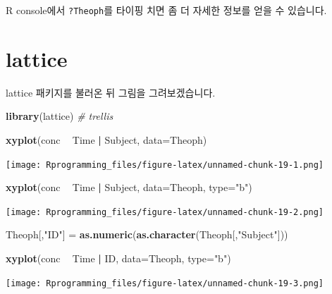 \documentclass[10pt,]{krantz}
\makeatletter
\newenvironment{Shaded}{\begin{snugshade}}{\end{snugshade}}
\newcommand{\KeywordTok}[1]{\textcolor[rgb]{0.13,0.29,0.53}{\textbf{#1}}}
\newcommand{\DataTypeTok}[1]{\textcolor[rgb]{0.13,0.29,0.53}{#1}}
\newcommand{\StringTok}[1]{\textcolor[rgb]{0.31,0.60,0.02}{#1}}
\newcommand{\CommentTok}[1]{\textcolor[rgb]{0.56,0.35,0.01}{\textit{#1}}}
\newcommand{\OperatorTok}[1]{\textcolor[rgb]{0.81,0.36,0.00}{\textbf{#1}}}
\newcommand{\NormalTok}[1]{#1}
\newenvironment{kframe}{%
\medskip{}
\setlength{\fboxsep}{.8em}
 \def\at@end@of@kframe{}%
 \ifinner\ifhmode%
  \def\at@end@of@kframe{\end{minipage}}%
  \begin{minipage}{\columnwidth}%
 \fi\fi%
 \def\FrameCommand##1{\hskip\@totalleftmargin \hskip-\fboxsep
 \colorbox{shadecolor}{##1}\hskip-\fboxsep
     \hskip-\linewidth \hskip-\@totalleftmargin \hskip\columnwidth}%
 \MakeFramed {\advance\hsize-\width
   \@totalleftmargin\z@ \linewidth\hsize
   \@setminipage}}%
 {\par\unskip\endMakeFramed%
 \at@end@of@kframe}
\renewenvironment{Shaded}{\begin{kframe}}{\end{kframe}}
\theoremstyle{definition}
\theoremstyle{definition}
\theoremstyle{remark}
\makeatother
\begin{document}
R console에서 \texttt{?Theoph}를 타이핑 치면 좀 더 자세한 정보를 얻을 수
있습니다.

\section{lattice}\label{lattice}

lattice 패키지를 불러온 뒤 그림을 그려보겠습니다. \citep{R-lattice}

\begin{Shaded}
\begin{Highlighting}[]
\KeywordTok{library}\NormalTok{(lattice) }\CommentTok{# trellis}

\KeywordTok{xyplot}\NormalTok{(conc }\OperatorTok{~}\StringTok{ }\NormalTok{Time }\OperatorTok{|}\StringTok{ }\NormalTok{Subject, }\DataTypeTok{data=}\NormalTok{Theoph)}
\end{Highlighting}
\end{Shaded}

\texttt{[image: Rprogramming\_files/figure-latex/unnamed-chunk-19-1.png]}

\begin{Shaded}
\begin{Highlighting}[]

\KeywordTok{xyplot}\NormalTok{(conc }\OperatorTok{~}\StringTok{ }\NormalTok{Time }\OperatorTok{|}\StringTok{ }\NormalTok{Subject, }\DataTypeTok{data=}\NormalTok{Theoph, }\DataTypeTok{type=}\StringTok{"b"}\NormalTok{)}
\end{Highlighting}
\end{Shaded}

\texttt{[image: Rprogramming\_files/figure-latex/unnamed-chunk-19-2.png]}

\begin{Shaded}
\begin{Highlighting}[]

\NormalTok{Theoph[,}\StringTok{"ID"}\NormalTok{] =}\StringTok{ }\KeywordTok{as.numeric}\NormalTok{(}\KeywordTok{as.character}\NormalTok{(Theoph[,}\StringTok{"Subject"}\NormalTok{]))}

\KeywordTok{xyplot}\NormalTok{(conc }\OperatorTok{~}\StringTok{ }\NormalTok{Time }\OperatorTok{|}\StringTok{ }\NormalTok{ID, }\DataTypeTok{data=}\NormalTok{Theoph, }\DataTypeTok{type=}\StringTok{"b"}\NormalTok{)}
\end{Highlighting}
\end{Shaded}

\texttt{[image: Rprogramming\_files/figure-latex/unnamed-chunk-19-3.png]}
\end{document}
